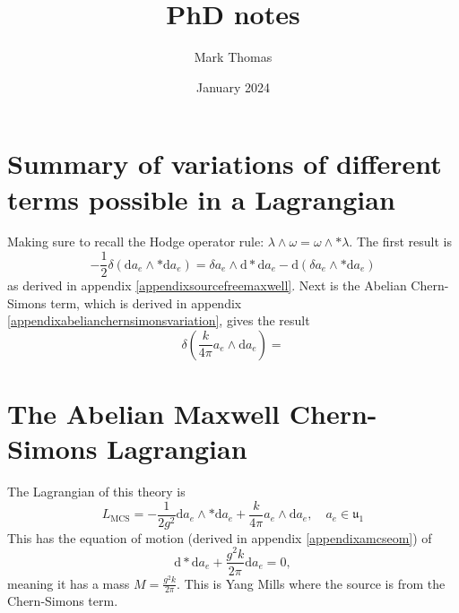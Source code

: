 \documentclass{article}
\title{PhD notes}
\author{Mark Thomas}
\date{January 2024}
\begin{document}
\maketitle


\section{Summary of variations of different terms possible in a Lagrangian}
Making sure to recall the Hodge operator rule: $\lambda \wedge \omega = \omega \wedge * \lambda$. The first result is
\begin{equation}
    -\frac{1}{2}\delta\left(\mathrm{d}a_{e}\wedge *\mathrm{d}a_{e} \right) = \delta a_{e}\wedge \mathrm{d} * \mathrm{d}a_{e}- \mathrm{d}\left(\delta{a}_{e}\wedge * \mathrm{d}a_{e} \right)
\end{equation}
as derived in appendix \ref{appendixsourcefreemaxwell}. Next is the Abelian Chern-Simons term, which is derived in appendix \ref{appendixabelianchernsimonsvariation}, gives the result
\begin{equation}
    \delta\left(\frac{k}{4\pi}a_{e}\wedge \mathrm{d}a_{e} \right) = 
\end{equation}


\section{The Abelian Maxwell Chern-Simons Lagrangian}
The Lagrangian of this theory is 
\begin{equation}
    L_{\text{MCS}} = -\frac{1}{2g^{2}} \mathrm{d}a_{e}\wedge * \mathrm{d}a_{e} + \frac{k}{4\pi}a_{e}\wedge \mathrm{d}a_{e},\quad a_{e}\in \mathfrak{u_{1}}
\end{equation}
This has the equation of motion (derived in appendix \ref{appendixamcseom}) of 
\begin{equation}
    \mathrm{d} * \mathrm{d} a_{e} + \frac{g^{2}k}{2\pi}\mathrm{d}a_{e}=0,
\end{equation}
meaning it has a mass $M = \frac{g^{2}k}{2\pi}$. This is Yang Mills where the source is from the Chern-Simons term. 
\end{document}
